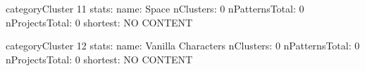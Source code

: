 \begin{multicols}{2}
\begin{description}[noitemsep,topsep=0pt]
categoryCluster 11 stats:
name: Space
nClusters: 0
nPatternsTotal: 0
nProjectsTotal: 0
shortest: NO CONTENT

\end{description}
\end{multicols}



\begin{multicols}{2}
\begin{description}[noitemsep,topsep=0pt]
categoryCluster 12 stats:
name: Vanilla Characters
nClusters: 0
nPatternsTotal: 0
nProjectsTotal: 0
shortest: NO CONTENT

\end{description}
\end{multicols}



